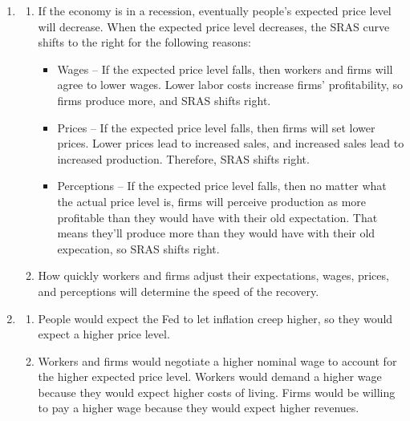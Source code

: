 \documentclass{article}
\begin{document}
\begin{enumerate}
\begin{enumerate}
	\end{enumerate}
	
\item

	\begin{enumerate}
	
	\item If the economy is in a recession, eventually people's expected price level will decrease. When the expected price level decreases, the SRAS curve shifts to the right for the following reasons:
	
		\begin{itemize}
		
		\item Wages -- If the expected price level falls, then workers and firms will agree to lower wages. Lower labor costs increase firms' profitability, so firms produce more, and SRAS shifts right.
		
		\item Prices -- If the expected price level falls, then firms will set lower prices. Lower prices lead to increased sales, and increased sales lead to increased production. Therefore, SRAS shifts right.
		
		\item Perceptions -- If the expected price level falls, then no matter what the actual price level is, firms will perceive production as more profitable than they would have with their old expectation. That means they'll produce more than they would have with their old expecation, so SRAS shifts right.
		
		\end{itemize}
		
	\item How quickly workers and firms adjust their expectations, wages, prices, and perceptions will determine the speed of the recovery.
	
	\end{enumerate}
	
\item

	\begin{enumerate}
	
	\item People would expect the Fed to let inflation creep higher, so they would expect a higher price level.
	
	\item Workers and firms would negotiate a higher nominal wage to account for the higher expected price level. Workers would demand a higher wage because they would expect higher costs of living. Firms would be willing to pay a higher wage because they would expect higher revenues.
	

\end{enumerate}
\end{enumerate}
\end{document}
